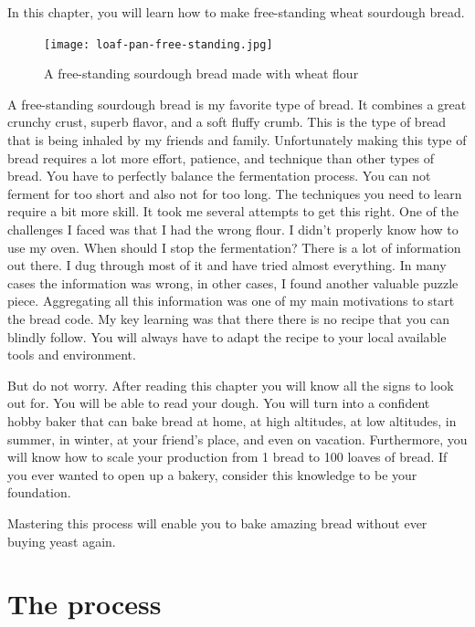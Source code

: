 In this chapter, you will learn how to make
free-standing wheat sourdough bread.

\begin{figure}[!htb]
  \texttt{[image: loaf-pan-free-standing.jpg]}
  \caption{A free-standing sourdough bread made with wheat flour}
\end{figure}

A free-standing sourdough bread is my favorite
type of bread. It combines a great crunchy crust, superb
flavor, and a soft fluffy crumb. This is the type of bread
that is being inhaled by my friends and family. Unfortunately
making this type of bread requires a lot more effort, patience,
and technique than other types of bread. You have to perfectly
balance the fermentation process. You can not ferment for too
short and also not for too long. The techniques you need to
learn require a bit more skill. It took me several attempts
to get this right. One of the challenges I faced was that
I had the wrong flour. I didn't properly know how to use my oven.
When should I stop the fermentation? There is a lot of information
out there. I dug through most of it and have tried almost everything.
In many cases the information was wrong, in other cases, I
found another valuable puzzle piece. Aggregating all this
information was one of my main motivations to start the bread code.
My key learning was that there there is no recipe that
you can blindly follow. You will always have to adapt the recipe
to your local available tools and environment.

But do not worry. After reading this chapter you will know
all the signs to look out for. You will be able to read your dough.
You will turn into a confident hobby baker that can bake bread
at home, at high altitudes, at low altitudes, in summer, in winter,
at your friend's place, and even on vacation. Furthermore,
you will know how to scale your production from 1 bread to 100 loaves of bread.
If you ever wanted to open up a bakery, consider this knowledge to
be your foundation.

Mastering this process will enable you to bake amazing bread without
ever buying yeast again.

\section{The process}

